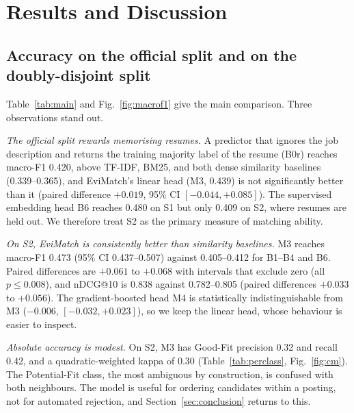 \section{Results and Discussion}\label{sec:results}
\subsection{Accuracy on the official split and on the doubly-disjoint split}
Table~\ref{tab:main} and Fig.~\ref{fig:macrof1} give the main comparison. Three observations stand out.

\emph{The official split rewards memorising resumes.} A predictor that ignores the job description and
returns the training majority label of the resume (B0r) reaches macro-F1 0.420, above TF-IDF, BM25, and both
dense similarity baselines (0.339--0.365), and EviMatch's linear head (M3, 0.439) is not significantly
better than it (paired difference $+0.019$, 95\% CI $[-0.044,+0.085]$). The supervised embedding head B6 reaches
0.480 on S1 but only 0.409 on S2, where resumes are held out. We therefore treat S2 as the primary
measure of matching ability.

\emph{On S2, EviMatch is consistently better than similarity baselines.} M3 reaches macro-F1 0.473
(95\% CI 0.437--0.507) against 0.405--0.412 for B1--B4 and B6. Paired differences are $+0.061$ to $+0.068$
with intervals that exclude zero (all $p\le0.008$), and nDCG@10 is 0.838 against 0.782--0.805
(paired differences $+0.033$ to $+0.056$). The gradient-boosted head M4 is statistically indistinguishable
from M3 ($-0.006$, $[-0.032,+0.023]$), so we keep the linear head, whose behaviour is easier to inspect.

\emph{Absolute accuracy is modest.} On S2, M3 has Good-Fit precision 0.32 and recall 0.42, and a
quadratic-weighted kappa of 0.30 (Table~\ref{tab:perclass}, Fig.~\ref{fig:cm}). The Potential-Fit class,
the most ambiguous by construction, is confused with both neighbours. The model is useful for ordering
candidates within a posting, not for automated rejection, and Section~\ref{sec:conclusion} returns to this.

\begin{table}[t]
\caption{Main results. S1: official split. S2: doubly-disjoint five-fold evaluation. AUC$_G$: ROC-AUC for
Good Fit vs.\ rest. nDCG@10 is the mean over postings with at least five candidates; S2 postings have fewer
candidates, so ranking levels are not comparable across the two splits. B0r exploits resume overlap and is a
diagnostic only. X1/X2 add single-document features that let a model memorise resumes.}
\label{tab:main}
\centering\scriptsize

\end{table}

